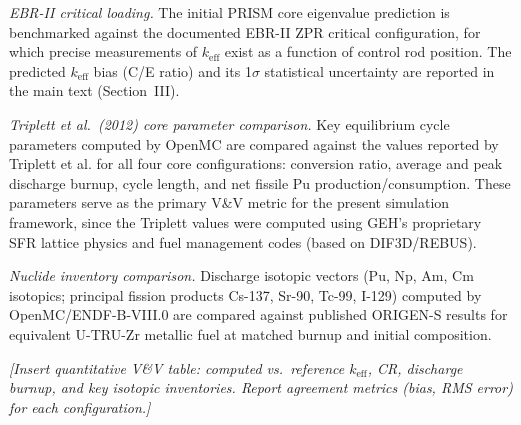 \documentclass[10pt,twoside]{article}
\newcommand{\placeholder}[1]{%
  \textcolor{placeholder}{\textit{[#1]}}}
\begin{document}
\textit{EBR-II critical loading.}  The initial PRISM core eigenvalue
prediction is benchmarked against the documented EBR-II ZPR critical
configuration, for which precise measurements of $k_\text{eff}$ exist
as a function of control rod position.  The predicted $k_\text{eff}$
bias (C/E ratio) and its 1$\sigma$ statistical uncertainty are reported
in the main text (Section~III).

\textit{Triplett et al.\ (2012) core parameter comparison.}  Key
equilibrium cycle parameters computed by OpenMC are compared against the
values reported by Triplett et al.\cite{Triplett2012} for all four core
configurations: conversion ratio, average and peak discharge burnup,
cycle length, and net fissile Pu production/consumption.  These parameters
serve as the primary V\&V metric for the present simulation framework,
since the Triplett values were computed using GEH's proprietary SFR
lattice physics and fuel management codes (based on DIF3D/REBUS).

\textit{Nuclide inventory comparison.}  Discharge isotopic vectors
(Pu, Np, Am, Cm isotopics; principal fission products Cs-137, Sr-90,
Tc-99, I-129) computed by OpenMC/ENDF-B-VIII.0 are compared against
published ORIGEN-S results for equivalent U-TRU-Zr metallic fuel
at matched burnup and initial composition.

\placeholder{Insert quantitative V\&V table: computed vs.\ reference
$k_\text{eff}$, CR, discharge burnup, and key isotopic inventories.
Report agreement metrics (bias, RMS error) for each configuration.}
\end{document}
